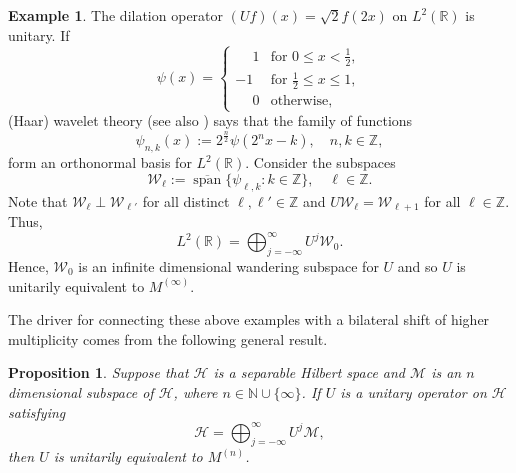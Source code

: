 \documentclass{dis}
\theoremstyle{plain}
\newtheorem{Proposition}[equation]{Proposition}
\theoremstyle{definition}
\newtheorem{Example}[equation]{Example}
\def\R{\mathbb{R}}
\def\N{\mathbb{N}}
\def\Z{\mathbb{Z}}
\renewcommand{\leq}{\leqslant}
\newcommand{\0}{{\color{lightgray}0}}
\begin{document}
\begin{Example}
The dilation operator  $(U f)(x) = \sqrt{2} f(2x)$ on $L^2(\R)$ is unitary. If 
$$\psi(x) = \begin{cases}
\phantom{-}1 & \mbox{for $0 \leq x < \frac{1}{2}$},\\
-1 & \mbox{for $\frac{1}{2} \leq x \leq 1$},\\
\phantom{-}0 & \mbox{otherwise},
\end{cases}$$
(Haar) wavelet theory \cite{MR1008470} (see also \cite{MR1117215}) says that the family of  functions 
$$\psi_{n, k}(x) := 2^{\frac{n}{2}} \psi(2^{n} x - k), \quad n, k \in \Z,$$
form an orthonormal basis for $L^2(\R)$. 
Consider the subspaces 
$$\mathcal{W}_{\ell} := \overline{\operatorname{span}}\{\psi_{\ell, k}: k \in \Z\}, \quad \ell \in \Z.$$
Note that  $\mathcal{W}_{\ell} \perp \mathcal{W}_{\ell'}$ for all  distinct $\ell, \ell' \in \Z$ 
and $U \mathcal{W}_{\ell} = \mathcal{W}_{\ell + 1}$ for all $\ell \in \Z$. Thus,
$$L^2(\R) = \bigoplus_{j = -\infty}^{\infty} U^{j} \mathcal{W}_{0}.$$
Hence,  $\mathcal{W}_{0}$ is an infinite dimensional wandering subspace for $U$ and 
so $U$ is unitarily equivalent to $M^{(\infty)}$.
\end{Example}

The driver for connecting these above examples with a bilateral shift of higher multiplicity comes from the following general result. 

\begin{Proposition}\label{sd9f9sdi8f7777yyyTTROOOOO}
Suppose that $\mathcal{H}$ is a separable Hilbert space and $\mathcal{M}$ is an $n$ dimensional subspace of $\mathcal{H}$, where $n \in \N \cup \{\infty\}$. If $U$ is a unitary operator on $\mathcal{H}$ satisfying 
\begin{equation}\label{wanderingU}
\mathcal{H} = \bigoplus_{j  = -\infty}^{\infty} U^{j} \mathcal{M},
\end{equation}
then $U$ is unitarily equivalent to $M^{(n)}$. 
\end{Proposition}
\end{document}
